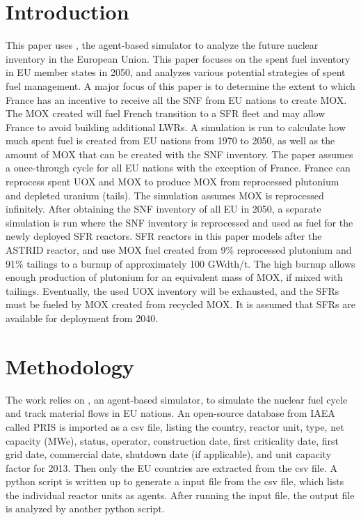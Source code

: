 \section{Introduction}
This paper uses \Cyclus, the agent-based simulator \cite{huff_fundamental_2016} to analyze
the future nuclear inventory in the European Union. This paper focuses on the spent fuel
inventory in \gls{EU} member states in 2050, and analyzes various potential strategies of spent fuel
management.
A major focus of this paper is to determine the extent to which France has an incentive
to receive all the \gls{SNF} from EU nations to create \gls{MOX}.
The \gls{MOX} created will fuel French transition to a \gls{SFR} fleet
and may allow France to avoid building additional \glspl{LWR}.
A \Cyclus simulation is run to calculate
how much spent fuel is created from EU nations from 1970 to 2050, as well as the amount
of \gls{MOX} that can be created with the \gls{SNF} inventory.
The paper assumes a once-through cycle for all 
EU nations with the exception of France. France can reprocess spent \gls{UOX} and \gls{MOX} to
produce \gls{MOX} from reprocessed plutonium and depleted uranium (tails).
The simulation assumes \gls{MOX} is reprocessed infinitely. 
After obtaining the \gls{SNF} inventory of all EU in 2050, a separate
simulation is run where the \gls{SNF} inventory is reprocessed and
used as fuel for the newly deployed \gls{SFR} reactors.
\gls{SFR} reactors in this paper models after the ASTRID reactor,
and use \gls{MOX} fuel created from 9\% reprocessed plutonium
and 91\% tailings to a burnup
of approximately 100 GWdth/t. The high burnup allows enough production of plutonium
for an equivalent mass of \gls{MOX}, if mixed with tailings.  Eventually,
the used \gls{UOX} inventory will be exhausted, and the \glspl{SFR} must be
fueled by \gls{MOX} created from recycled \gls{MOX}.
It is assumed that \glspl{SFR} are available for deployment
from 2040. 


\section{Methodology}
The work relies on \Cyclus, an agent-based simulator, to simulate the nuclear fuel cycle
and track material flows in EU nations. An open-source database from \gls{IAEA} called
\gls{PRIS} is imported as a csv file, listing the country, reactor unit, type, net capacity (MWe), status,
operator, construction date, first criticality date, first grid date, commercial date, shutdown
date (if applicable), and unit capacity factor for 2013. Then only the EU countries are extracted
from the csv file. A python script is written up to generate a \Cyclus input file from the csv file,
which lists the individual reactor units as agents. After running the \Cyclus input file,
the output file is analyzed by another python script.

